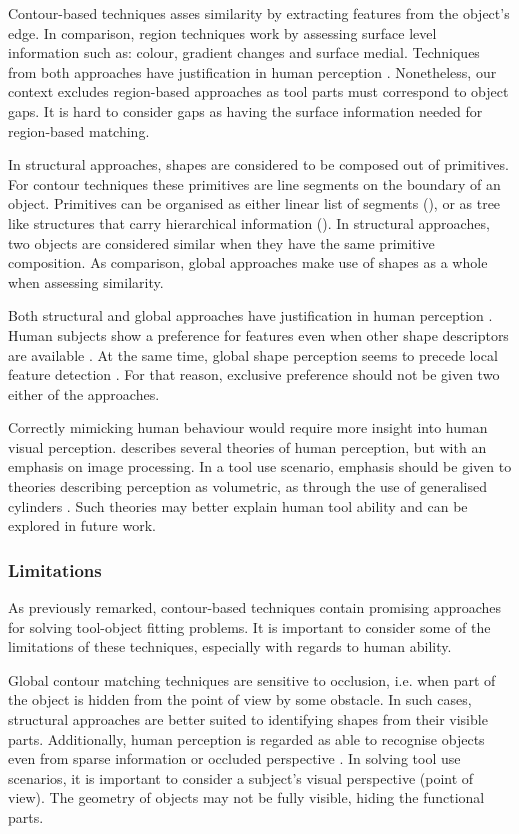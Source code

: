 \documentclass[
    floatsintext
]{article}
\begin{document}
Contour-based techniques asses similarity by extracting features from the object's edge.
In comparison, region techniques work by assessing surface level information such as: colour, gradient changes and surface medial.
Techniques from both approaches have justification in human perception \cite{chatbri2016}.
Nonetheless, our context excludes region-based approaches as tool parts must correspond to object gaps.
It is hard to consider gaps as having the surface information needed for region-based matching.

In structural approaches, shapes are considered to be composed out of primitives. For contour techniques these primitives are line segments on the boundary of an object.
Primitives can be organised as either linear list of segments (\cite{zhang2004}), or as tree like structures that carry hierarchical information (\cite{zhu2015}).
In structural approaches, two objects are considered similar when they have the same primitive composition.
As comparison, global approaches make use of shapes as a whole when assessing similarity. 

Both structural and global approaches have justification in human perception \cite{zhang2004}.
Human subjects show a preference for features even when other shape descriptors are available \cite{chatbri2016}.
At the same time, global shape perception seems to precede local feature detection \cite{navon1977}. 
For that reason, exclusive preference should not be given two either of the approaches.

Correctly mimicking human behaviour would require more insight into human visual perception.
\cite{loncaric1998} describes several theories of human perception, but with an emphasis on image processing.
In a tool use scenario, emphasis should be given to theories describing perception as volumetric, as through the use of generalised cylinders \cite{dickinson2014}.
Such theories may better explain human tool ability and can be explored in future work.    

\subsubsection{Limitations}
As previously remarked, contour-based techniques contain promising approaches for solving tool-object fitting problems.
It is important to consider some of the limitations of these techniques, especially with regards to human ability. 

Global contour matching techniques are sensitive to occlusion, i.e. when part of the object is hidden from the point of view by some obstacle.
In such cases, structural approaches are better suited to identifying shapes from their visible parts.
Additionally, human perception is regarded as able to recognise objects even from sparse information or occluded perspective \cite{loncaric1998}.
In solving tool use scenarios, it is important to consider a subject's visual perspective (point of view).
The geometry of objects may not be fully visible, hiding the functional parts.
\end{document}
